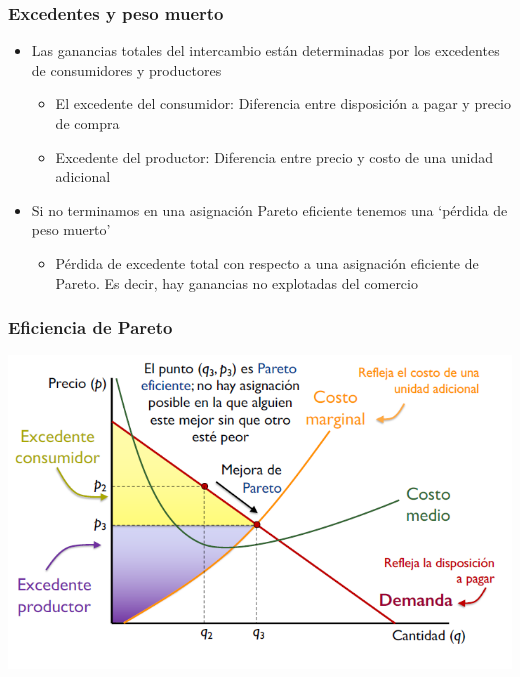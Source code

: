 \documentclass{beamer}
\begin{document}
\begin{frame}
\frametitle{Excedentes y peso muerto}
\begin{itemize}
    \item Las ganancias totales del intercambio están determinadas por los excedentes de consumidores y productores
    \begin{itemize}
        \item El excedente del consumidor: Diferencia entre disposición a pagar y precio de compra
        \item Excedente del productor: Diferencia entre precio y costo de una unidad adicional
    \end{itemize}
    \item Si no terminamos en una asignación Pareto eficiente tenemos una ‘pérdida de peso muerto’
    \begin{itemize}
        \item Pérdida de excedente total con respecto a una asignación eficiente de Pareto. Es decir, hay ganancias no explotadas del comercio
    \end{itemize}
    \end{itemize}
\end{frame}



\begin{frame}
\frametitle{Eficiencia de Pareto}
\includegraphics[scale=0.6]{../Figures/Tema_06.40_excedente3.png}
\end{frame}
\end{document}
